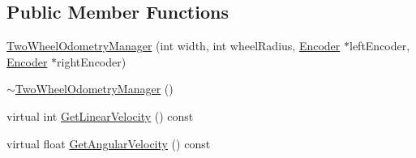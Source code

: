 \subsection*{Public Member Functions}
\begin{DoxyCompactItemize}
\item 
\hyperlink{class_two_wheel_odometry_manager_a8ac5ef96d7753f0022803b0580591ca1}{Two\-Wheel\-Odometry\-Manager} (int width, int wheel\-Radius, \hyperlink{class_encoder}{Encoder} $\ast$left\-Encoder, \hyperlink{class_encoder}{Encoder} $\ast$right\-Encoder)
\item 
\hyperlink{class_two_wheel_odometry_manager_ab6a596af05b4606d60fb169b82710e04}{$\sim$\-Two\-Wheel\-Odometry\-Manager} ()
\item 
virtual int \hyperlink{class_two_wheel_odometry_manager_a0221669c64b5155424c277dca2e52c2e}{Get\-Linear\-Velocity} () const 
\item 
virtual float \hyperlink{class_two_wheel_odometry_manager_a532a00ad59defba9d54749568cd841ed}{Get\-Angular\-Velocity} () const 
\end{DoxyCompactItemize}


